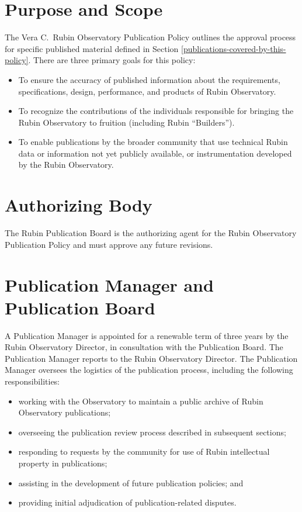 
\section{Purpose and Scope}\label{purpose-and-scope}

The Vera C.\ Rubin Observatory Publication Policy outlines the approval process for specific published material defined in Section \ref{publications-covered-by-this-policy}.
There are three primary goals for this policy:

\begin{itemize}
\item
  To ensure the accuracy of published information about the requirements, specifications, design, performance, and products of Rubin Observatory.
\item
  To recognize the contributions of the individuals responsible for bringing the Rubin Observatory to fruition (including Rubin ``Builders'').
\item
  To enable publications by the broader community that use technical Rubin data or information not yet publicly available, or instrumentation developed by the Rubin Observatory.
\end{itemize}

\section{Authorizing Body}\label{authorizing-body}

The Rubin Publication Board is the authorizing agent for the Rubin Observatory Publication Policy and must approve any future revisions.

\section{Publication Manager and Publication Board}\label{publication-manager-and-publication-board}

A Publication Manager is appointed for a renewable term of three years by the Rubin Observatory Director, in consultation with the Publication Board.
The Publication Manager reports to the Rubin Observatory Director.
The Publication Manager oversees the logistics of the publication process, including the following responsibilities:

\begin{itemize}
\item
  working with the Observatory to maintain a public archive of Rubin Observatory publications;
\item
  overseeing the publication review process described in subsequent sections;
\item
  responding to requests by the community for use of Rubin intellectual property in publications;
\item
  assisting in the development of future publication policies; and
\item
  providing initial adjudication of publication-related disputes.
\end{itemize}

